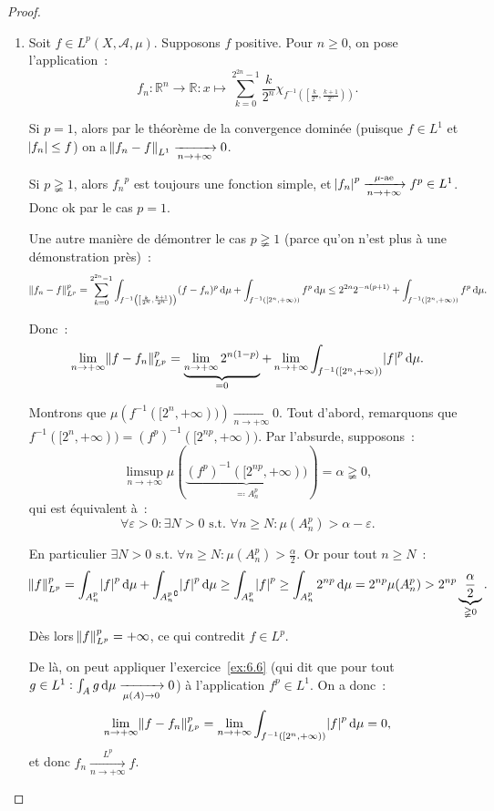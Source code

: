 \documentclass{article}
\newcommand{\pinfty}{{+\infty}}
\newcommand{\st}{\text{ s.t. }}
\newcommand{\C}{\complement}
\newcommand{\R}{{\mathbb R}}
\begin{document}
\begin{proof}~
\begin{enumerate}
	\item Soit $f \in L^p(X, \mathcal A, \mu)$. Supposons $f$ positive. Pour $n \geq 0$, on pose l'application~:
	\[f_n : \R^n \to \R : x \mapsto \sum_{k=0}^{2^{2n}-1}\frac k{2^n}\chi_{f^{-1}\left(\left[\frac k{2^n}, \frac {k+1}{2^n}\right)\right)}.\]

	Si $p=1$, alors par le théorème de la convergence dominée (puisque $f \in L^1$ et $\abs {f_n} \leq f$) on a $\norm {f_n-f}_{L^1} \xrightarrow[n \to \pinfty]{} 0$.

	Si $p \gneqq 1$, alors ${f_n}^p$ est toujours une fonction simple, et $\abs {f_n}^p \xrightarrow[n \to \pinfty]{\mu\text{-ae}} f^p \in L^1$. Donc ok par le cas $p=1$.

	Une autre manière de démontrer le cas $p \gneqq 1$ (parce qu'on n'est plus à une démonstration près)~:
	\[\norm {f_n-f}_{L^p}^p = \sum_{k=0}^{2^{2n}-1}\int_{f^{-1}\left(\left[\frac k{2^n}, \frac {k+1}{2^n}\right)\right)}(f-f_n)^p\dif\mu + \int_{f^{-1}([2^n, \pinfty))}f^p\dif\mu
		\leq 2^{2n}2^{-n(p+1)} + \int_{f^{-1}([2^n, \pinfty))}f^p\dif\mu.\]

	Donc~:
	\[\lim_{n \to \pinfty}\norm {f-f_n}_{L^p}^p = \underbrace {\lim_{n \to \pinfty}2^{n(1-p)}}_{= 0} + \lim_{n \to \pinfty}\int_{f^{-1}([2^n, \pinfty))}\abs f^p\dif\mu.\]

	Montrons que $\mu\left(f^{-1}([2^n, \pinfty))\right) \xrightarrow[n \to \pinfty]{} 0$. Tout d'abord, remarquons que $f^{-1}([2^n, \pinfty)) = (f^p)^{-1}([2^{np}, \pinfty))$.
	Par l'absurde, supposons~:
	\[\limsup_{n \to \pinfty}\mu\left(\underbrace {(f^p)^{-1}([2^{np}, \pinfty))}_{\eqqcolon A_n^p}\right) = \alpha \gneqq 0,\]
	qui est équivalent à~:
	\[\forall \varepsilon > 0 : \exists N > 0 \st \forall n \geq N : \mu(A_n^p) > \alpha-\varepsilon.\]

	En particulier $\exists N > 0 \st \forall n \geq N : \mu(A_n^p) > \frac \alpha2$. Or pour tout $n \geq N$~:
	\[\norm f_{L^p}^p = \int_{A_n^p}\abs f^p\dif\mu + \int_{{A_n^p}^\C}\abs f^p\dif\mu \geq \int_{A_n^p}\abs f^p \geq \int_{A_n^p}2^{np}\dif\mu = 2^{np}\mu(A_n^p)
	> 2^{np}\underbrace {\frac \alpha2}_{\gneqq 0}.\]
	Dès lors $\norm f_{L^p}^p = \pinfty$, ce qui contredit $f \in L^p$.

	De là, on peut appliquer l'exercice~\ref{ex:6.6} (qui dit que pour tout $g \in L^1 : \int_Ag\dif\mu \xrightarrow[\mu(A) \to 0]{} 0$) à l'application
	$f^p \in L^1$. On a donc~:
	\[\lim_{n \to \pinfty}\norm {f-f_n}_{L^p}^p = \lim_{n \to \pinfty}\int_{f^{-1}([2^n, \pinfty))}\abs f^p\dif\mu = 0,\]
	et donc $f_n \xrightarrow[n \to \pinfty]{L^p} f$.


\end{enumerate}
\end{proof}
\end{document}
